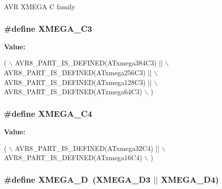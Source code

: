 A\-V\-R X\-M\-E\-G\-A C family \hypertarget{group__xmega__part__macros__group_ga10c26d10c3df7d9874e4527d1327c60b}{
\subsubsection[{X\-M\-E\-G\-A\-\_\-\-C3}]{\setlength{\rightskip}{0pt plus 5cm}\#define X\-M\-E\-G\-A\-\_\-\-C3}}\label{group__xmega__part__macros__group_ga10c26d10c3df7d9874e4527d1327c60b}
{\bfseries Value\-:}
\begin{DoxyCode}
( \(\backslash\)
        AVR8\_PART\_IS\_DEFINED(ATxmega384C3)  || \(\backslash\)
        AVR8\_PART\_IS\_DEFINED(ATxmega256C3)  || \(\backslash\)
        AVR8\_PART\_IS\_DEFINED(ATxmega128C3)  || \(\backslash\)
        AVR8\_PART\_IS\_DEFINED(ATxmega64C3) \(\backslash\)
        )
\end{DoxyCode}
\hypertarget{group__xmega__part__macros__group_ga8add217f9d3d28fda40ec91e65a5d970}{
\subsubsection[{X\-M\-E\-G\-A\-\_\-\-C4}]{\setlength{\rightskip}{0pt plus 5cm}\#define X\-M\-E\-G\-A\-\_\-\-C4}}\label{group__xmega__part__macros__group_ga8add217f9d3d28fda40ec91e65a5d970}
{\bfseries Value\-:}
\begin{DoxyCode}
( \(\backslash\)
        AVR8\_PART\_IS\_DEFINED(ATxmega32C4)  || \(\backslash\)
        AVR8\_PART\_IS\_DEFINED(ATxmega16C4) \(\backslash\)
        )
\end{DoxyCode}
\hypertarget{group__xmega__part__macros__group_gacc9e4b074c3f87ce7b461483b0beb15c}{
\subsubsection[{X\-M\-E\-G\-A\-\_\-\-D}]{\setlength{\rightskip}{0pt plus 5cm}\#define X\-M\-E\-G\-A\-\_\-\-D~({\bf X\-M\-E\-G\-A\-\_\-\-D3} $|$$|$ {\bf X\-M\-E\-G\-A\-\_\-\-D4})}}\label{group__xmega__part__macros__group_gacc9e4b074c3f87ce7b461483b0beb15c}
